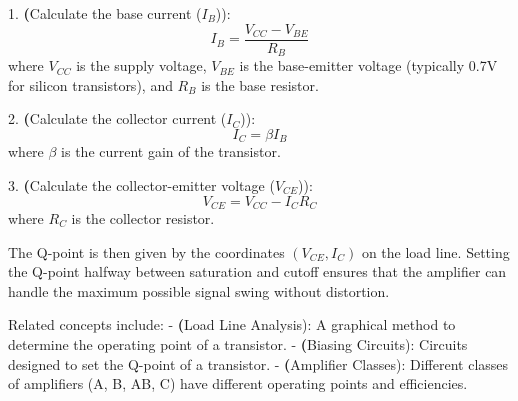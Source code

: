 1. \textbf(Calculate the base current (\(I_B\))):
   \[
   I_B = \frac{V_{CC} - V_{BE}}{R_B}
   \]
   where \(V_{CC}\) is the supply voltage, \(V_{BE}\) is the base-emitter voltage (typically 0.7V for silicon transistors), and \(R_B\) is the base resistor.

2. \textbf(Calculate the collector current (\(I_C\))):
   \[
   I_C = \beta I_B
   \]
   where \(\beta\) is the current gain of the transistor.

3. \textbf(Calculate the collector-emitter voltage (\(V_{CE}\))):
   \[
   V_{CE} = V_{CC} - I_C R_C
   \]
   where \(R_C\) is the collector resistor.

The Q-point is then given by the coordinates \((V_{CE}, I_C)\) on the load line. Setting the Q-point halfway between saturation and cutoff ensures that the amplifier can handle the maximum possible signal swing without distortion.

Related concepts include:
- \textbf(Load Line Analysis): A graphical method to determine the operating point of a transistor.
- \textbf(Biasing Circuits): Circuits designed to set the Q-point of a transistor.
- \textbf(Amplifier Classes): Different classes of amplifiers (A, B, AB, C) have different operating points and efficiencies.

